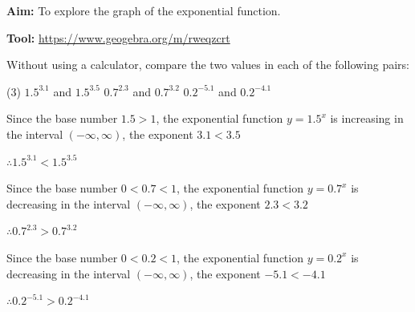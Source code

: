 \documentclass{report}
\begin{document}
\begin{explore}
	        
	\textbf{Aim:} To explore the graph of the exponential function.
	        
	\textbf{Tool:} \url{https://www.geogebra.org/m/rweqzcrt}
\end{explore}
\vspace{1em}

\begin{question}
	Without using a calculator, compare the two values in each of the following pairs:
	\begin{tasks}[label=(\alph*)](3)
		\task $1.5^{3.1}$ and $1.5^{3.5}$
		\task $0.7^{2.3}$ and $0.7^{3.2}$
		\task $0.2^{-5.1}$ and $0.2^{-4.1}$
	\end{tasks}
	
	\sol{}
	\begin{tasks}[label=(\alph*)]
		\task Since the base number $1.5>1$, the exponential function $y=1.5^x$ is increasing in the interval $(-\infty, \infty)$,
		the exponent $3.1<3.5$
		            
		$
		\therefore 1.5^{3.1}<1.5^{3.5}
		$
		
		\task Since the base number $0<0.7<1$, the exponential function $y=0.7^x$ is decreasing in the interval $(-\infty, \infty)$,
		the exponent $2.3<3.2$
		            
		$
		\therefore 0.7^{2.3}>0.7^{3.2}
		$
		
		\task Since the base number $0<0.2<1$, the exponential function $y=0.2^x$ is decreasing in the interval $(-\infty, \infty)$,
		the exponent $-5.1<-4.1$
		
		$
		\therefore 0.2^{-5.1}>0.2^{-4.1}
		$
	\end{tasks}
\end{question}
\vspace{-1em}
\end{document}
